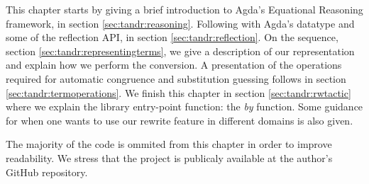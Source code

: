 This chapter starts by giving a brief introduction to Agda's Equational Reasoning framework, in section \ref{sec:tandr:reasoning}. Following with Agda's  datatype and some of the reflection API, in section \ref{sec:tandr:reflection}. 
On the sequence, section \ref{sec:tandr:representingterms}, we give a description of our  representation
and explain how we perform the conversion. A presentation of the operations required for 
automatic congruence and substitution guessing follows in section \ref{sec:tandr:termoperations}.
We finish this chapter in section \ref{sec:tandr:rwtactic} where we explain the library entry-point function: the \emph{by} function.
Some guidance for when one wants to use our rewrite feature in different domains is also given.

The majority of the code is ommited from this chapter in order to improve readability. We
stress that the project is publicaly available at the author's GitHub repository.
